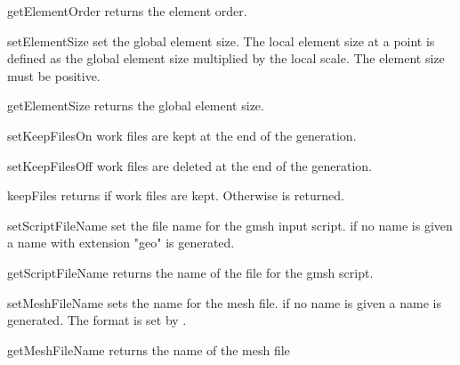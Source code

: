 \begin{methoddesc}[Design]{getElementOrder}{}
returns the element order.
\end{methoddesc}

\begin{methoddesc}[Design]{setElementSize}{}
set the global element size. The local element size at a point is defined as
the global element size multiplied by the local scale. The element size must be positive.
\end{methoddesc}


\begin{methoddesc}[Design]{getElementSize}{}
returns the global element size.
\end{methoddesc}



\begin{methoddesc}[Design]{setKeepFilesOn}{}
work files are kept at the end of the generation.
\end{methoddesc}

\begin{methoddesc}[Design]{setKeepFilesOff}{}
work files are deleted at the end of the generation.
\end{methoddesc}

\begin{methoddesc}[Design]{keepFiles}{}
returns \True if work files are kept. Otherwise \False is returned.
\end{methoddesc}

\begin{methoddesc}[Design]{setScriptFileName}{}
set the file name for the gmsh input script. if no name is given a name with extension "geo" is generated.
\end{methoddesc}

\begin{methoddesc}[Design]{getScriptFileName}{}
returns the name of the file for the gmsh script.
\end{methoddesc}


\begin{methoddesc}[Design]{setMeshFileName}{}
sets the name for the mesh file. if no name is given a name is generated.
The format is set by .
\end{methoddesc}

\begin{methoddesc}[Design]{getMeshFileName}{}
returns the name of the mesh file
\end{methoddesc}



